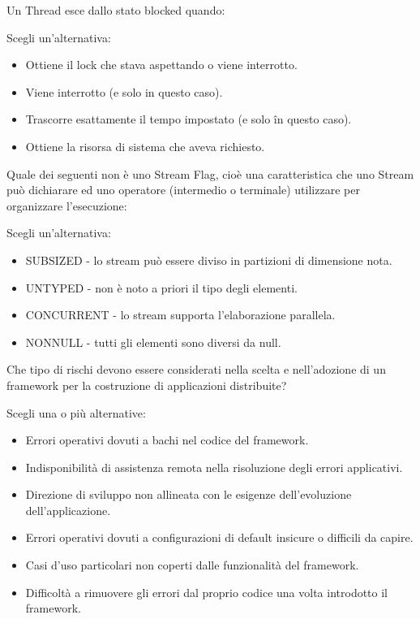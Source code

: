 \documentclass{article}
\begin{document}
Un Thread esce dallo stato blocked quando:

Scegli un'alternativa:

\begin{itemize}
	\item Ottiene il lock che stava aspettando o viene interrotto.
	\item Viene interrotto (e solo in questo caso).
	\item Trascorre esattamente il tempo impostato (e solo în questo caso).
	\item \checkmark Ottiene la risorsa di sistema che aveva richiesto.
\end{itemize}

Quale dei seguenti non è uno Stream Flag, cioè una caratteristica che uno Stream può dichiarare ed uno operatore (intermedio o terminale) utilizzare per organizzare
l'esecuzione:

Scegli un'alternativa: 

\begin{itemize}
	\item SUBSIZED - lo stream può essere diviso in partizioni di dimensione nota.
	\item \checkmark UNTYPED - non è noto a priori il tipo degli elementi.
	\item CONCURRENT - lo stream supporta l'elaborazione parallela.
	\item NONNULL - tutti gli elementi sono diversi da null.
\end{itemize}

Che tipo di rischi devono essere considerati nella scelta e nell'adozione di un framework per la costruzione di applicazioni distribuite?

Scegli una o più alternative:

\begin{itemize}
	\item \checkmark Errori operativi dovuti a bachi nel codice del framework. 
	\item Indisponibilità di assistenza remota nella risoluzione degli errori applicativi.
	\item \checkmark Direzione di sviluppo non allineata con le esigenze dell'evoluzione dell'applicazione.
	\item Errori operativi dovuti a configurazioni di default insicure o difficili da capire.
	\item \checkmark Casi d'uso particolari non coperti dalle funzionalità del framework. 
	\item Difficoltà a rimuovere gli errori dal proprio codice una volta introdotto il framework.
\end{itemize}
\end{document}
